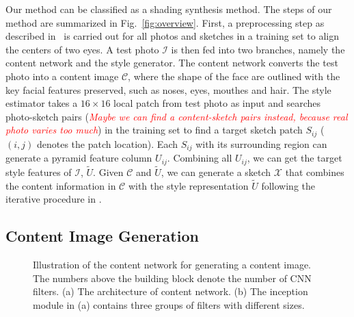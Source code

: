 \documentclass[10pt,twocolumn,letterpaper]{article}
\def\comm[#1]{{\small \textcolor{red}{\emph{#1}}}}
\begin{document}
Our method can be classified as a shading synthesis method. The steps of our method are summarized in Fig.~\ref{fig:overview}. First, a preprocessing step as described in~\cite{wang2009face} is carried out for all photos and sketches in a training set to align the centers of two eyes. A test photo $\mathcal{I}$ is then fed into two branches, namely the content network and the style generator. The content network converts the test photo into a content image $\mathcal{C}$, where the shape of the face are outlined with the key facial features preserved, such as noses, eyes, mouthes and hair. The style estimator takes a $16\times16$ local patch from test photo as input and searches photo-sketch pairs (\comm[Maybe we can find a content-sketch pairs instead, because real photo varies too much]) in the training set to find a target sketch patch $S_{ij}$ ($(i, j)$ denotes the patch location). Each  $S_{ij}$ with its surrounding region can generate a pyramid feature column $U_{ij}$. Combining all $U_{ij}$, we can get the target style features of $\mathcal{I}$, \ie $\tilde{U}$. Given $\mathcal{C}$ and $\tilde{U}$, we can generate a sketch $\mathcal{X}$ that combines the content information in $\mathcal{C}$ with the style representation $\tilde{U}$ following the iterative procedure in \cite{gatys2015neural}. 

\subsection{Content Image Generation}
\begin{figure}[htbp]
\centering
{}
\caption{Illustration of the content network for generating a content image. The numbers above the building block denote the number of CNN filters. (a) The architecture of content network. (b) The inception module in (a) contains three groups of filters with different sizes.}
\label{fig:content_NN}
\end{figure}
\end{document}
